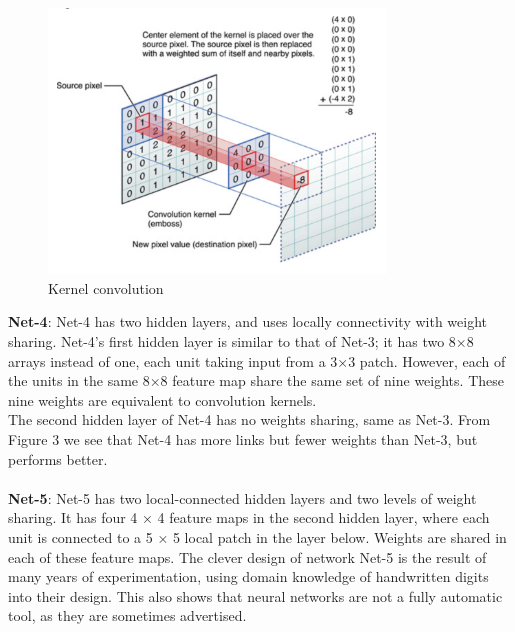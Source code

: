 \documentclass[a4paper]{article}
\begin{document}
\begin{figure}[h]
\centering
\includegraphics[width=0.8\textwidth]{Kernel_convolution}
\caption{Kernel convolution}
\end{figure}

\textbf{Net-4}: Net-4 has two hidden layers, and uses locally connectivity with weight sharing. Net-4’s first hidden layer is similar to that of Net-3; it has two 8×8 arrays instead of one, each unit taking input from a 3×3 patch. However, each of the units in the same 8×8 feature map share the same set of nine weights. These nine weights are equivalent to convolution kernels. 
\\The second hidden layer of Net-4 has no weights sharing, same as Net-3. From Figure 3 we see that Net-4 has more links but fewer weights than Net-3, but performs better.\\ \\
\textbf{Net-5}: Net-5 has two local-connected hidden layers and two levels of weight sharing. It has four 4 × 4 feature maps in the second hidden layer, where each unit is connected to a 5 × 5 local patch in the layer below. Weights are shared in each of these feature maps. The clever design of network Net-5 is the result of many years of experimentation, using domain knowledge of handwritten digits into their design. This also shows that neural networks are not a fully automatic tool, as they are sometimes advertised.\\
\end{document}
